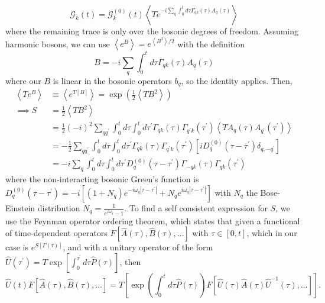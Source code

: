 \begin{equation}
\mathcal{G}_k(t)=\mathcal{G}_k^{(0)}(t)\left\langle T e^{-i \sum_q \int_0^t d \tau \Gamma_{q k}(\tau) A_q(\tau)}\right\rangle
\end{equation}
 where the remaining trace is only over the bosonic degrees of freedom. Assuming harmonic bosons, we can use $\left\langle e^B \right\rangle = e^{\left\langle B^2\right\rangle / 2}$ with the definition
\begin{equation}
    B=-i \sum_q \int_0^t d \tau \Gamma_{q k}(\tau) A_q(\tau)
\end{equation}
where our $B$ is linear in the bosonic operators $b_q$, so the identity applies. Then, 
\begin{align}
\left\langle T e^B\right\rangle & \equiv \left\langle  e^{T[B]}\right\rangle = \exp\left(\frac{1}{2}\left\langle T B^2\right\rangle\right) \\
\implies S & =\frac{1}{2}\left\langle T B^2\right\rangle \\
& =\frac{1}{2}(-i)^2 \sum_{q q^{\prime}} \int_0^t d \tau \int_0^t d \tau^{\prime} \Gamma_{q k}(\tau) \Gamma_{q^{\prime} k}\left(\tau^{\prime}\right)\left\langle T A_q(\tau) A_{q^{\prime}}\left(\tau^{\prime}\right)\right\rangle \\
& =-\frac{1}{2} \sum_{q q^{\prime}} \int_0^t d \tau \int_0^t d \tau^{\prime} \Gamma_{q k}(\tau) \Gamma_{q^{\prime} k}\left(\tau^{\prime}\right)\left[i D_q^{(0)}\left(\tau-\tau^{\prime}\right) \delta_{q,-q^{\prime}}\right] \\
& = -i \sum_q \int_0^t d \tau \int_0^t d \tau^{\prime} D_q^{(0)}\left(\tau-\tau^{\prime}\right) \Gamma_{-q k}(\tau) \Gamma_{q k}\left(\tau^{\prime}\right) 
\end{align}
where the non-interacting bosonic Green's function is $D_q^{(0)}\left(\tau-\tau^{\prime}\right)=-i \left[(1+N_q) e^{-i \omega_q |\tau-\tau^{\prime}|} + N_q e^{i \omega_q |\tau-\tau^{\prime}|}\right]$ with $N_q$ the Bose-Einstein distribution $N_q = \frac{1}{e^{\beta \omega_q}-1}$. 
To find a self consistent expression for $S$, we use the Feynman operator ordering theorem, which states that given a functional of time-dependent operators $F[\hat{A}(\tau), \hat{B}(\tau), \ldots]$ with $\tau \in[0, t]$, which in our case is $e^{S[\Gamma (\tau)]}$, and with a unitary operator of the form $\hat{U}\left(\tau^{\prime}\right)=T \exp \left[\int_0^{\tau^{\prime}} d \tau \hat{P}(\tau)\right]$, then
\begin{equation}
\hat{U}(t) F[\hat{A}(\tau), \hat{B}(\tau), \ldots] =T\left[\exp \left(\int_0^t d \tau \hat{P}(\tau)\right) F\left[\hat{U}(\tau) \hat{A}(\tau) \hat{U}^{-1}(\tau), \ldots\right]\right] .
\end{equation}
